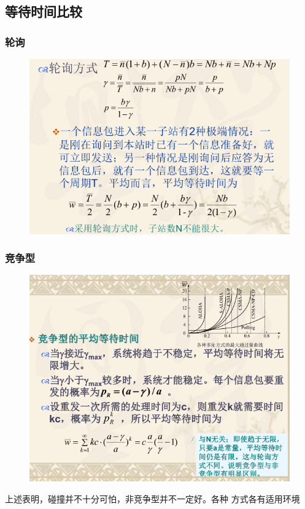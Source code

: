 \subsection{等待时间比较}
\subsubsection{轮询}
\begin{figure}[H]
	\centering
	\includegraphics[width=0.7\linewidth]{figures/screenshot017}
	\caption{}
	\label{fig:screenshot017}
\end{figure}
\subsubsection{竞争型}
\begin{figure}[H]
	\centering
	\includegraphics[width=0.7\linewidth]{figures/screenshot018}
	\caption{}
	\label{fig:screenshot018}
\end{figure}
上述表明，碰撞并不十分可怕，非竞争型并不一定好。各种
方式各有适用环境









